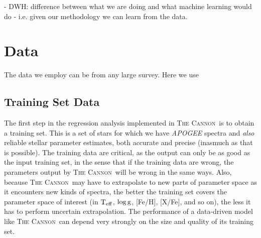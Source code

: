 \documentclass[12pt, preprint]{aastex}
\newcommand{\teff}{\mbox{$\rm T_{eff}$}}
\newcommand{\logg}{\mbox{$\rm \log g$}}
\newcommand{\tc}{\textsc{The Cannon}}
\begin{document}

- DWH: difference between what we are doing and what machine learning would do - i.e. given our methodology we can learn from the data. 



\section{Data}

The data we employ can be from any large survey. Here we use 

\subsection{Training Set Data}

The first step in the regression analysis implemented in \tc\ is to
obtain a training set.
This is a set of stars for which we have \textit{APOGEE} spectra and
\emph{also} reliable stellar parameter estimates, both accurate and
precise (inasmuch as that is possible).
The training data are critical, as the output can only be as good as
the input training set, in the sense that if the training data are
wrong, the parameters output by \tc\ will be wrong in the same ways.
Also, because \tc\ may have to extrapolate to new parts of parameter
space as it encounters new kinds of spectra, the better the training
set covers the parameter space of interest (in \teff, \logg, [Fe/H],
[X/Fe], and so on), the less it has to perform uncertain
extrapolation.
The performance of a data-driven model like \tc\ can depend very
strongly on the size and quality of its training set.
\end{document}
